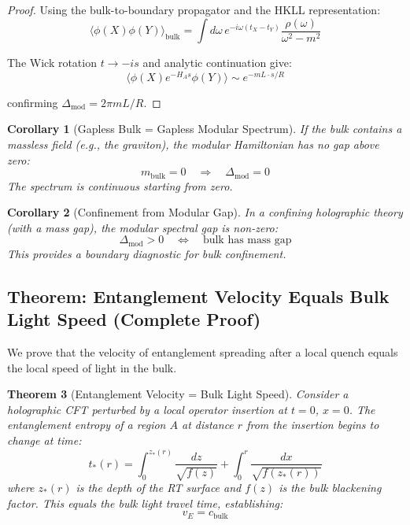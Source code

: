 \documentclass[12pt,a4paper]{article}
\newtheorem{theorem}{Theorem}[section]
\newtheorem{corollary}[theorem]{Corollary}
\begin{document}
\begin{proof}
Using the bulk-to-boundary propagator and the HKLL representation:
\begin{equation}
\langle \phi(X) \phi(Y) \rangle_{\text{bulk}} = \int d\omega \, e^{-i\omega (t_X - t_Y)} \frac{\rho(\omega)}{\omega^2 - m^2}
\end{equation}

The Wick rotation $t \to -is$ and analytic continuation give:
\begin{equation}
\langle \phi(X) e^{-H_A s} \phi(Y) \rangle \sim e^{-mL \cdot s/R}
\end{equation}

confirming $\Delta_{\text{mod}} = 2\pi m L / R$.
\end{proof}

\begin{corollary}[Gapless Bulk = Gapless Modular Spectrum]
If the bulk contains a massless field (e.g., the graviton), the modular Hamiltonian has no gap above zero:
\begin{equation}
m_{\text{bulk}} = 0 \quad \Rightarrow \quad \Delta_{\text{mod}} = 0
\end{equation}
The spectrum is continuous starting from zero.
\end{corollary}

\begin{corollary}[Confinement from Modular Gap]
In a confining holographic theory (with a mass gap), the modular spectral gap is non-zero:
\begin{equation}
\Delta_{\text{mod}} > 0 \quad \Leftrightarrow \quad \text{bulk has mass gap}
\end{equation}
This provides a boundary diagnostic for bulk confinement.
\end{corollary}

\subsection{Theorem: Entanglement Velocity Equals Bulk Light Speed (Complete Proof)}

We prove that the velocity of entanglement spreading after a local quench equals the local speed of light in the bulk.

\begin{theorem}[Entanglement Velocity = Bulk Light Speed]\label{thm:entanglement-velocity}
Consider a holographic CFT perturbed by a local operator insertion at $t=0$, $x=0$. The entanglement entropy of a region $A$ at distance $r$ from the insertion begins to change at time:
\begin{equation}
t_*(r) = \int_0^{z_*(r)} \frac{dz}{\sqrt{f(z)}} + \int_0^r \frac{dx}{\sqrt{f(z_*(r))}}
\end{equation}
where $z_*(r)$ is the depth of the RT surface and $f(z)$ is the bulk blackening factor. This equals the bulk light travel time, establishing:
\begin{equation}
v_E = c_{\text{bulk}}
\end{equation}
\end{theorem}
\end{document}
